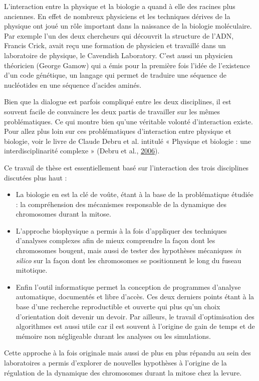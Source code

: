 \documentclass[12pt,a4paper,twoside,openright]{book}
\begin{document}
L'interaction entre la physique et la biologie a quand à elle des
racines plus anciennes. En effet de nombreux physiciens et les
techniques dérives de la physique ont joué un rôle important dans la
naissance de la biologie moléculaire. Par exemple l'un des deux
chercheurs qui découvrit la structure de l'ADN, Francis Crick, avait
reçu une formation de physicien et travaillé dans un laboratoire de
physique, le Cavendish Laboratory. C'est aussi un physicien théoricien
(George Gamow) qui a émis pour la première fois l'idée de l'existence
d'un code génétique, un langage qui permet de traduire une séquence de
nucléotides en une séquence d'acides aminés.

Bien que la dialogue est parfois compliqué entre les deux disciplines,
il est souvent facile de convaincre les deux partis de travailler sur
les mêmes problématiques. Ce qui montre bien qu'une véritable volonté
d'interaction existe. Pour allez plus loin sur ces problématiques
d'interaction entre physique et biologie, voir le livre de Claude Debru
et al. intitulé « Physique et biologie : une interdisciplinarité
complexe » (Debru et al., \hyperref[ref-Debru]{2006}).

Ce travail de thèse est essentiellement basé sur l'interaction des trois
disciplines discutées plus haut :

\begin{itemize}
\item
  La biologie en est la clé de voûte, étant à la base de la
  problématique étudiée : la compréhension des mécanismes responsable de
  la dynamique des chromosomes durant la mitose.
\item
  L'approche biophysique a permis à la fois d'appliquer des techniques
  d'analyses complexes afin de mieux comprendre la façon dont les
  chromosomes bougent, mais aussi de tester des hypothèses mécaniques
  \emph{in silico} sur la façon dont les chromosomes se positionnent le
  long du fuseau mitotique.
\item
  Enfin l'outil informatique permet la conception de programmes
  d'analyse automatique, documentés et libre d'accès. Ces deux derniers
  points étant à la base d'une recherche reproductible et ouverte qui
  plus qu'un choix d'orientation doit devenir un devoir. Par ailleurs,
  le travail d'optimisation des algorithmes est aussi utile car il est
  souvent à l'origine de gain de temps et de mémoire non négligeable
  durant les analyses ou les simulations.
\end{itemize}

Cette approche à la fois originale mais aussi de plus en plus répandu au
sein des laboratoires a permis d'explorer de nouvelles hypothèses à
l'origine de la régulation de la dynamique des chromosomes durant la
mitose chez la levure.
\end{document}
